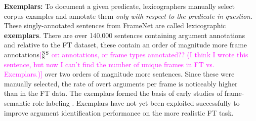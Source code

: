 \documentclass[11pt,a4paper]{article}
\newcommand{\ensuretext}[1]{#1}
\newcommand{\nssmarker}{\ensuretext{\textcolor{magenta}{\ensuremath{^{\textsc{NS}}_{\textsc{S}}}}}}
\newcommand{\mkmarker}{\ensuretext{\textcolor{red}{\ensuremath{^{\textsc{M}}_{\textsc{K}}}}}}
\newcommand{\stmarker}{\ensuretext{\textcolor{blue}{\ensuremath{^{\textsc{S}}_{\textsc{T}}}}}}
\newcommand{\arkcomment}[3]{\ensuretext{\textcolor{#3}{[#1 #2]}}}
\newcommand{\nss}[1]{\arkcomment{\nssmarker}{#1}{magenta}}
\newcommand{\mk}[1]{\arkcomment{\mkmarker}{#1}{red}}
\newcommand{\st}[1]{\arkcomment{\stmarker}{#1}{blue}}
\begin{document}
\noindent\textbf{Exemplars:} To document a given predicate, lexicographers manually select corpus examples and annotate them
\emph{only with respect to the predicate in question}.
These singly-annotated sentences from FrameNet are called lexicographic \textbf{exemplars}.
There are over 140,000 sentences containing argument annotations %
and relative to the FT dataset, these contain an order of magnitude more frame annotations\nss{or: annotations, or frame types annotated?? 
(I think I wrote this sentence, but now I can't find the number of unique frames in FT vs. Exemplars.)} over two orders of magnitude 
more sentences. Since these were manually selected, the rate of overt arguments per frame
is noticeably higher than in the FT data.
The exemplars formed the basis of early studies of frame-semantic role
labeling \citep[e.g.,][]{gildea-02,thompson-03,fleischman-03,litkowski-04,kwon-04}.
Exemplars have not yet been exploited successfully to improve
argument identification performance on the more realistic FT task.
\end{document}
